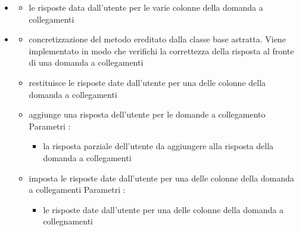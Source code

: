 \begin{itemize}
\item {}
\begin{itemize}
\item {}
\newline
le risposte data dall'utente per le varie colonne della domanda a collegamenti
\end{itemize}
\item {}
\begin{itemize}
\item {}
\newline
concretizzazione del metodo ereditato dalla classe base astratta. Viene implementato in modo che verifichi la correttezza della risposta al fronte di una domanda a collegamenti
\newline
\item {}
\newline
restituisce le risposte date dall'utente per una delle colonne della domanda a collegamenti
\newline
\item {}
\newline
aggiunge una risposta dell'utente per le domande a collegamento
\newline
Parametri :
\begin{itemize}
\item {}
\newline
la risposta parziale dell'utente da aggiungere alla risposta della domanda a collegamenti
\end{itemize}
\item {}
\newline
imposta le risposte date dall'utente per una delle colonne della domanda a collegamenti
\newline
Parametri :
\begin{itemize}
\item {}
\newline
le risposte date dall'utente per una delle colonne della domanda a collegnamenti
\end{itemize}
\end{itemize}
\end{itemize}

